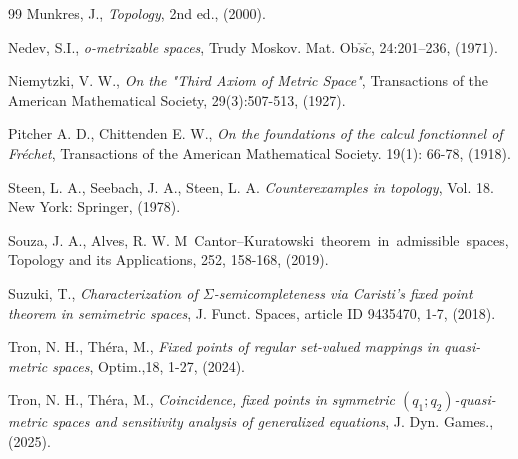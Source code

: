 \documentclass{article}
\def\text#1{\,\;\hbox{#1}\;\,}
\begin{document}
\begin{thebibliography}{99}
Munkres, J., \textit{Topology}, 2nd ed., (2000).

  Nedev, S.I., \textit{o-metrizable spaces}, Trudy Moskov. Mat. Ob$\check{s}\check{c}$, 24:201–236, (1971).

 Niemytzki, V. W.,
\textit{On the "Third Axiom of Metric Space"}, Transactions of the American Mathematical Society, 29(3):507-513, (1927).

 Pitcher A. D., Chittenden E. W., \textit{On the foundations of the calcul fonctionnel of Fréchet}, Transactions of the American Mathematical Society. 19(1): 66-78, (1918).

Steen, L. A., Seebach, J. A., Steen, L. A. \textit{Counterexamples in topology}, Vol. 18. New York: Springer, (1978).

Souza, J. A., Alves, R. W. M
\text{Cantor–Kuratowski theorem in admissible spaces,}
Topology and its Applications, 252, 158-168,
 (2019).

Suzuki, T., \textit{  Characterization of $\Sigma$-semicompleteness via Caristi's fixed
point theorem in semimetric spaces}, J. Funct. Spaces,   article ID 9435470, 1-7, (2018).

 Tron, N. H., Théra, M., \textit{Fixed points of regular set-valued mappings in quasi-metric spaces}, Optim.,18, 1-27, (2024). 

 Tron, N. H., Théra, M., \textit{ Coincidence, fixed points in symmetric $(q_1; q_2)$-quasi-metric spaces and sensitivity analysis of generalized equations}, J. Dyn. Games., (2025).


\end{thebibliography}
\end{document}
